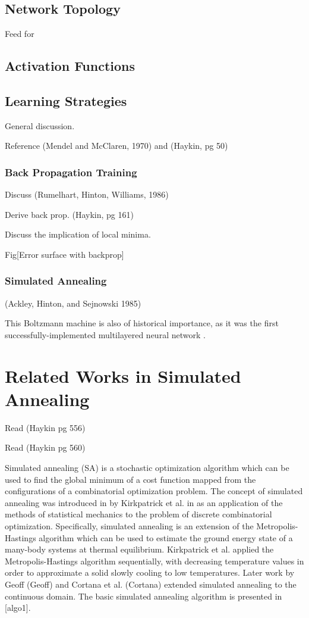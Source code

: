 \documentclass[11pt]{afthesis}
\begin{document}
\subsection{Network Topology}

Feed for

\subsection{Activation Functions}

\subsection{Learning Strategies}

General discussion.

Reference (Mendel and McClaren, 1970) and (Haykin, pg 50)

\subsubsection{Back Propagation Training}

Discuss (Rumelhart, Hinton, Williams, 1986)

Derive back prop. (Haykin, pg 161)

Discuss the implication of local minima.

Fig[Error surface with backprop]


\subsubsection{Simulated Annealing}

(Ackley, Hinton, and Sejnowski 1985) 

This Boltzmann machine is also of historical importance, as it was the first successfully-implemented multilayered neural network \cite{haykin1999}.


\section{Related Works in Simulated Annealing}

Read (Haykin pg 556)

Read (Haykin pg 560)

Simulated annealing (SA) is a stochastic optimization algorithm which can be used to find the global minimum of a cost function mapped from the configurations of a combinatorial optimization problem. The concept of simulated annealing was introduced in by Kirkpatrick et al. in \cite{kirkpatrick1983} as an application of the methods of statistical mechanics to the problem of discrete combinatorial optimization. Specifically, simulated annealing is an extension of the Metropolis-Hastings \cite{metropolis1953} algorithm which can be used to estimate the ground energy state of a many-body systems at thermal equilibrium. Kirkpatrick et al. applied the Metropolis-Hastings algorithm sequentially, with decreasing temperature values in order to approximate a solid slowly cooling to low temperatures. Later work by Geoff (Geoff) and Cortana et al. (Cortana) extended simulated annealing to the continuous domain. The basic simulated annealing algorithm is presented in [algo1]. 
\end{document}
